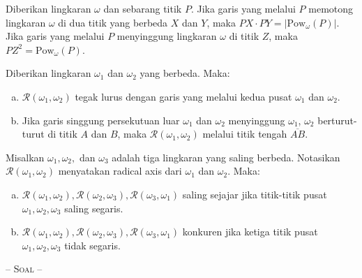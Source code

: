 \documentclass[12pt]{scrartcl}
\begin{document}
\begin{tcolorbox}[colback=blue!5!white,colframe=blue!75!black,title=\textbf{Teorema 5: Power of Point Theorem}]
Diberikan lingkaran $\omega$ dan sebarang titik $P$. Jika garis yang melalui $P$ memotong lingkaran $\omega$ di dua titik yang berbeda $X$ dan $Y$, maka $PX\cdot PY=|\text{Pow}_\omega(P)|$. Jika garis yang melalui $P$ menyinggung lingkaran $\omega$ di titik $Z$, maka $PZ^2=\text{Pow}_\omega(P)$.
\end{tcolorbox}
\begin{tcolorbox}[colback=blue!5!white,colframe=blue!75!black,title=\textbf{Sifat 6: Radical Axis}]
Diberikan lingkaran $\omega_1$ dan $\omega_2$ yang berbeda. Maka:
\begin{enumerate}[(a).]
\item $\mathcal{R}(\omega_1,\omega_2)$ tegak lurus dengan garis yang melalui kedua pusat $\omega_1$ dan $\omega_2$.
\item Jika garis singgung persekutuan luar $\omega_1$ dan $\omega_2$ menyinggung $\omega_1$, $\omega_2$ berturut-turut di titik $A$ dan $B$, maka $\mathcal{R}(\omega_1,\omega_2)$ melalui titik tengah $\overline{AB}$.
\end{enumerate}
\end{tcolorbox}
\begin{tcolorbox}[colback=blue!5!white,colframe=blue!75!black,title=\textbf{Teorema 7: Radical Axis Theorem}]
Misalkan $\omega_1,\omega_2,$ dan $\omega_3$ adalah tiga lingkaran yang saling berbeda. Notasikan $\mathcal{R}(\omega_1,\omega_2)$ menyatakan radical axis dari $\omega_1$ dan $\omega_2$. Maka:
\begin{enumerate}[(a).]
\item $\mathcal{R}(\omega_1,\omega_2),\mathcal{R}(\omega_2,\omega_3),\mathcal{R}(\omega_3,\omega_1)$ saling sejajar jika titik-titik pusat $\omega_1,\omega_2,\omega_3$ saling segaris.
\item $\mathcal{R}(\omega_1,\omega_2),\mathcal{R}(\omega_2,\omega_3),\mathcal{R}(\omega_3,\omega_1)$ konkuren jika ketiga titik pusat $\omega_1,\omega_2,\omega_3$ tidak segaris.
\end{enumerate}
\end{tcolorbox}
\begin{center}
\scshape{-- Soal --}
\end{center}
\end{document}
